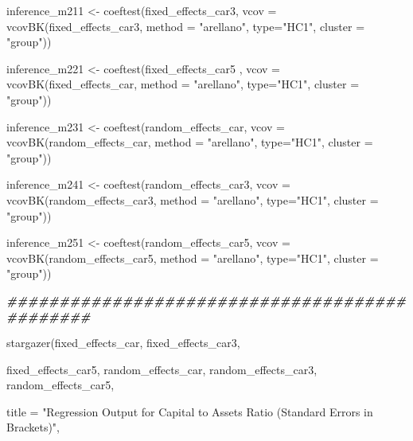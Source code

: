 \documentclass[a4paper,nobind]{templates/ociamthesis}
\newenvironment{Shaded}{\begin{snugshade}}{\end{snugshade}}
\newcommand{\AttributeTok}[1]{\textcolor[rgb]{0.77,0.63,0.00}{#1}}
\newcommand{\DocumentationTok}[1]{\textcolor[rgb]{0.56,0.35,0.01}{\textbf{\textit{#1}}}}
\newcommand{\FunctionTok}[1]{\textcolor[rgb]{0.00,0.00,0.00}{#1}}
\newcommand{\NormalTok}[1]{#1}
\newcommand{\OtherTok}[1]{\textcolor[rgb]{0.56,0.35,0.01}{#1}}
\newcommand{\StringTok}[1]{\textcolor[rgb]{0.31,0.60,0.02}{#1}}
\renewenvironment{Shaded}
{
  \vspace{10pt}%
  \begin{snugshade}%
}{%
  \end{snugshade}%
  \vspace{8pt}%
}
\begin{document}
\begin{landscape}
\begin{Shaded}
\begin{Highlighting}[]
\NormalTok{inference\_m211 }\OtherTok{\textless{}{-}} \FunctionTok{coeftest}\NormalTok{(fixed\_effects\_car3, }\AttributeTok{vcov =} \FunctionTok{vcovBK}\NormalTok{(fixed\_effects\_car3, }\AttributeTok{method =} \StringTok{"arellano"}\NormalTok{, }\AttributeTok{type=}\StringTok{"HC1"}\NormalTok{, }\AttributeTok{cluster =} \StringTok{"group"}\NormalTok{))}

\NormalTok{inference\_m221 }\OtherTok{\textless{}{-}} \FunctionTok{coeftest}\NormalTok{(fixed\_effects\_car5 , }\AttributeTok{vcov =} \FunctionTok{vcovBK}\NormalTok{(fixed\_effects\_car, }\AttributeTok{method =} \StringTok{"arellano"}\NormalTok{, }\AttributeTok{type=}\StringTok{"HC1"}\NormalTok{, }\AttributeTok{cluster =} \StringTok{"group"}\NormalTok{))}

\NormalTok{inference\_m231 }\OtherTok{\textless{}{-}} \FunctionTok{coeftest}\NormalTok{(random\_effects\_car, }\AttributeTok{vcov =} \FunctionTok{vcovBK}\NormalTok{(random\_effects\_car, }\AttributeTok{method =} \StringTok{"arellano"}\NormalTok{, }\AttributeTok{type=}\StringTok{"HC1"}\NormalTok{, }\AttributeTok{cluster =} \StringTok{"group"}\NormalTok{))}

\NormalTok{inference\_m241 }\OtherTok{\textless{}{-}} \FunctionTok{coeftest}\NormalTok{(random\_effects\_car3, }\AttributeTok{vcov =} \FunctionTok{vcovBK}\NormalTok{(random\_effects\_car3, }\AttributeTok{method =} \StringTok{"arellano"}\NormalTok{, }\AttributeTok{type=}\StringTok{"HC1"}\NormalTok{, }\AttributeTok{cluster =} \StringTok{"group"}\NormalTok{))}

\NormalTok{inference\_m251 }\OtherTok{\textless{}{-}} \FunctionTok{coeftest}\NormalTok{(random\_effects\_car5, }\AttributeTok{vcov =} \FunctionTok{vcovBK}\NormalTok{(random\_effects\_car5, }\AttributeTok{method =} \StringTok{"arellano"}\NormalTok{, }\AttributeTok{type=}\StringTok{"HC1"}\NormalTok{, }\AttributeTok{cluster =} \StringTok{"group"}\NormalTok{))}


\DocumentationTok{\#\#\#\#\#\#\#\#\#\#\#\#\#\#\#\#\#\#\#\#\#\#\#\#\#\#\#\#\#\#\#\#\#\#\#\#\#\#\#\#\#\#\#\#\#\#}

\FunctionTok{stargazer}\NormalTok{(fixed\_effects\_car, fixed\_effects\_car3, }
          
\NormalTok{          fixed\_effects\_car5, random\_effects\_car, random\_effects\_car3, random\_effects\_car5,}
          
          \AttributeTok{title =} \StringTok{"Regression Output for Capital to Assets Ratio (Standard Errors in Brackets)"}\NormalTok{, }
          

\end{Highlighting}
\end{Shaded}
\end{landscape}
\end{document}
